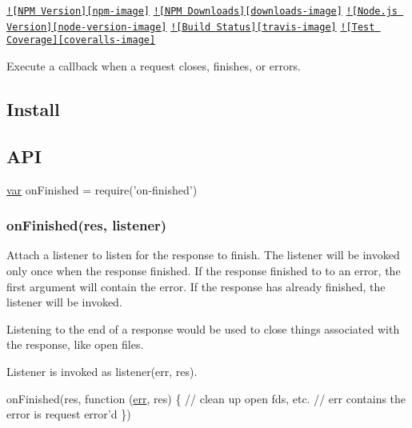 \href{https://npmjs.org/package/on-finished}{\tt !\mbox{[}N\+P\+M Version\mbox{]}\mbox{[}npm-\/image\mbox{]}} \href{https://npmjs.org/package/on-finished}{\tt !\mbox{[}N\+P\+M Downloads\mbox{]}\mbox{[}downloads-\/image\mbox{]}} \href{http://nodejs.org/download/}{\tt !\mbox{[}Node.\+js Version\mbox{]}\mbox{[}node-\/version-\/image\mbox{]}} \href{https://travis-ci.org/jshttp/on-finished}{\tt !\mbox{[}Build Status\mbox{]}\mbox{[}travis-\/image\mbox{]}} \href{https://coveralls.io/r/jshttp/on-finished?branch=master}{\tt !\mbox{[}Test Coverage\mbox{]}\mbox{[}coveralls-\/image\mbox{]}}

Execute a callback when a request closes, finishes, or errors.

\subsection*{Install}




\subsection*{A\+P\+I}


\begin{DoxyCode}
\hyperlink{018__def_8c_a335628f2e9085305224b4f9cc6e95ed5}{var} onFinished = require(\textcolor{stringliteral}{'on-finished'})
\end{DoxyCode}


\subsubsection*{on\+Finished(res, listener)}

Attach a listener to listen for the response to finish. The listener will be invoked only once when the response finished. If the response finished to to an error, the first argument will contain the error. If the response has already finished, the listener will be invoked.

Listening to the end of a response would be used to close things associated with the response, like open files.

Listener is invoked as {\ttfamily listener(err, res)}.


\begin{DoxyCode}
onFinished(res, \textcolor{keyword}{function} (\hyperlink{message_8cpp_aede5746344fdce99647541101eaa7f06}{err}, res) \{
  \textcolor{comment}{// clean up open fds, etc.}
  \textcolor{comment}{// err contains the error is request error'd}
\})
\end{DoxyCode}


